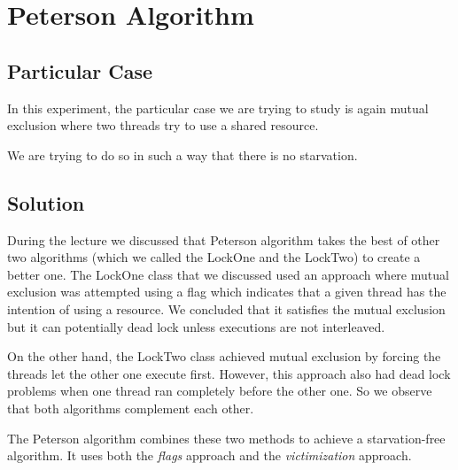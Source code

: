 \section{\textbf{Peterson Algorithm}}
\subsection{Particular Case}
\par
In this experiment, the particular case we are trying to study is again mutual
exclusion where two threads try to use a shared resource.
\par
We are trying to do so in such a way that there is no starvation.
\par
\subsection{Solution}
\par
During the lecture we discussed that Peterson algorithm takes the best of
other two algorithms (which we called the LockOne and the LockTwo) to create a
better one. The LockOne class that we discussed used an approach where mutual
exclusion was attempted using a flag which indicates that a given thread has the
intention of using a resource. We concluded that it satisfies the mutual
exclusion but it can potentially dead lock unless executions are not
interleaved.
\par
On the other hand, the LockTwo class achieved mutual exclusion by forcing the
threads let the other one execute first. However,  this approach also had dead
lock problems when one thread ran completely before the other one. So we observe
that both algorithms complement each other.
\par
 The Peterson algorithm combines these two methods to achieve a starvation-free
algorithm. It uses both the \textit{flags} approach and the
\textit{victimization} approach. 
\par

